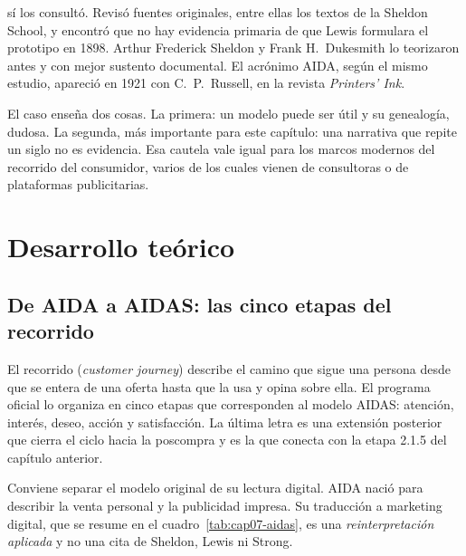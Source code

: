 \textcite{iwamoto2024origenaida} sí los consultó. Revisó fuentes
originales, entre ellas los textos de la Sheldon School, y encontró que no
hay evidencia primaria de que Lewis formulara el prototipo en 1898. Arthur
Frederick Sheldon y Frank H.\ Dukesmith lo teorizaron antes y con mejor
sustento documental. El acrónimo AIDA, según el mismo estudio, apareció en 1921
con C.\ P.\ Russell, en la revista \textit{Printers' Ink}.

El caso enseña dos cosas. La primera: un modelo puede ser útil y su genealogía,
dudosa. La segunda, más importante para este capítulo: una narrativa que
repite un siglo no es evidencia. Esa cautela vale igual para los marcos
modernos del recorrido del consumidor, varios de los cuales vienen de
consultoras o de plataformas publicitarias.

\section{Desarrollo teórico}

\subsection{De AIDA a AIDAS: las cinco etapas del recorrido}
\label{sec:cap07-aidas}

El recorrido (\textit{customer journey}) describe el camino que sigue una
persona desde que se entera de una oferta hasta que la usa y opina sobre
ella. El programa oficial lo organiza en cinco etapas que corresponden al
modelo AIDAS: atención, interés, deseo, acción y satisfacción. La última letra
es una extensión posterior que cierra el ciclo hacia la poscompra y es la
que conecta con la etapa 2.1.5 del capítulo anterior.

Conviene separar el modelo original de su lectura digital. AIDA nació para
describir la venta personal y la publicidad impresa. Su traducción a
marketing digital, que se resume en el cuadro~\ref{tab:cap07-aidas}, es una
\emph{reinterpretación aplicada} y no una cita de Sheldon, Lewis ni Strong.

